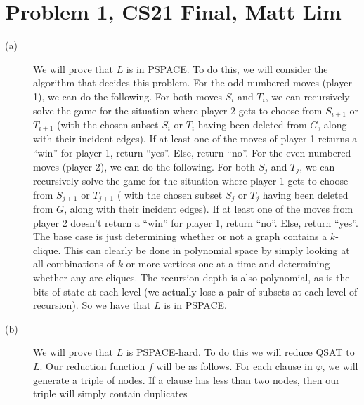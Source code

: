\documentclass{article}
\begin{document}



\section*{Problem 1, CS21 Final, Matt Lim}
\begin{description}
    \item[(a)]
        We will prove that $L$ is in PSPACE. To do this, we will consider the
        algorithm that decides this problem. For the odd numbered moves (player
        1), we can do the following. For both moves $S_i$ and $T_i$, we can
        recursively solve the game for the situation where player 2 gets to
        choose from $S_{i+1}$ or $T_{i+1}$ (with the chosen subset
        $S_i$ or $T_i$ having been deleted from $G$, along with their
        incident edges). If at least one of the moves of player 1
        returns a ``win'' for player 1, return ``yes''. Else, return ``no''. For the
        even numbered moves (player 2), we can do the following. For both
        $S_j$ and $T_j$, we can recursively solve the game for the situation
        where player 1 gets to choose from $S_{j+1}$ or $T_{j+1}$ ( with the
        chosen subset $S_j$ or $T_j$ having been deleted from $G$, along with their
        incident edges).  If at least
        one of the moves from player 2 doesn't return a ``win'' for player 1, return ``no''.
        Else, return ``yes''. The base case is just determining whether or not
        a graph contains a $k$-clique. This can clearly be done in polynomial
        space by simply looking at all combinations of $k$ or more vertices
        one at a time and determining whether any are cliques. The recursion depth
        is also polynomial, as is the bits of state at each level (we actually lose
        a pair of subsets at each level of recursion).  So we have that $L$ is in PSPACE.
    \item[(b)]
        We will prove that $L$ is PSPACE-hard. To do this we will reduce QSAT
        to $L$. Our reduction function $f$ will be as follows. For each
        clause in $\varphi$, we will generate a triple of nodes. If a clause
        has less than two nodes, then our triple will simply contain duplicates

\end{description}
\end{document}
